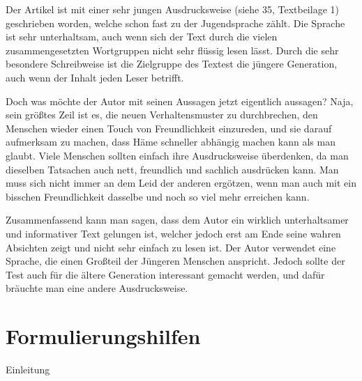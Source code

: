 Der Artikel ist mit einer sehr jungen Ausdrucksweise (siehe 35, Textbeilage 1) geschrieben worden, welche schon fast zu der Jugendsprache zählt. Die Sprache ist sehr unterhaltsam, auch wenn sich der Text durch die vielen zusammengesetzten Wortgruppen nicht sehr flüssig lesen lässt. Durch die sehr besondere Schreibweise ist die Zielgruppe des Textest die jüngere Generation, auch wenn der Inhalt jeden Leser betrifft. 

Doch was möchte der Autor mit seinen Aussagen jetzt eigentlich aussagen? Naja, sein größtes Zeil ist es, die neuen Verhaltensmuster zu durchbrechen, den Menschen wieder einen Touch von Freundlichkeit einzureden, und sie darauf aufmerksam zu machen, dass Häme schneller abhängig machen kann als man glaubt. Viele Menschen sollten einfach ihre Ausdrucksweise überdenken, da man dieselben Tatsachen auch nett, freundlich und sachlich ausdrücken kann. Man muss sich nicht immer an dem Leid der anderen ergötzen, wenn man auch mit ein bisschen Freundlichkeit dasselbe und noch so viel mehr erreichen kann. 

Zusammenfassend kann man sagen, dass dem Autor ein wirklich unterhaltsamer und informativer Text gelungen ist, welcher jedoch erst am Ende seine wahren Absichten zeigt und nicht sehr einfach zu lesen ist. Der Autor verwendet eine Sprache, die einen Großteil der Jüngeren Menschen anspricht. Jedoch sollte der Test auch für die ältere Generation interessant gemacht werden, und dafür bräuchte man eine andere Ausdrucksweise.


\section{Formulierungshilfen}
Einleitung

